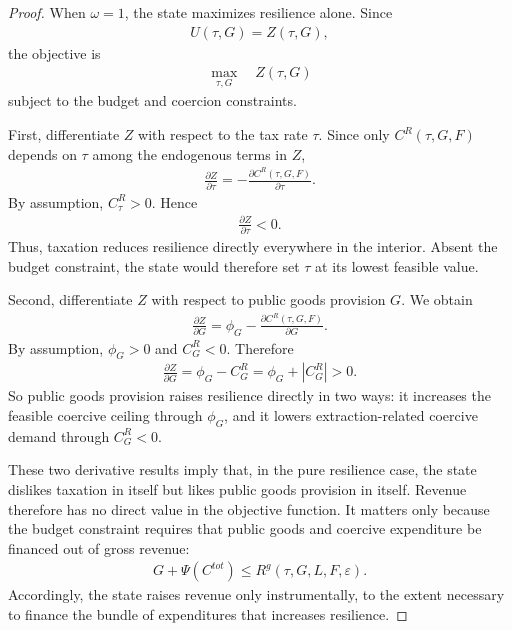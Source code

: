 \documentclass[12pt]{article}
\begin{document}
\begin{proof}
When $\omega=1$, the state maximizes resilience alone. Since
\begin{align}
U(\tau,G) = Z(\tau,G),
\end{align}
the objective is
\begin{align}
\max_{\tau,G} \quad Z(\tau,G)
\end{align}
subject to the budget and coercion constraints.

First, differentiate $Z$ with respect to the tax rate $\tau$. Since only $C^R(\tau,G,F)$ depends on $\tau$ among the endogenous terms in $Z$,
\begin{align}
\frac{\partial Z}{\partial \tau}
= - \frac{\partial C^R(\tau,G,F)}{\partial \tau}.
\end{align}
By assumption, $C^R_\tau>0$. Hence
\begin{align}
\frac{\partial Z}{\partial \tau} < 0.
\end{align}
Thus, taxation reduces resilience directly everywhere in the interior. Absent the budget constraint, the state would therefore set $\tau$ at its lowest feasible value.

Second, differentiate $Z$ with respect to public goods provision $G$. We obtain
\begin{align}
\frac{\partial Z}{\partial G}
= \phi_G - \frac{\partial C^R(\tau,G,F)}{\partial G}.
\end{align}
By assumption, $\phi_G>0$ and $C^R_G<0$. Therefore
\begin{align}
\frac{\partial Z}{\partial G}
= \phi_G - C^R_G
= \phi_G + |C^R_G|
> 0.
\end{align}
So public goods provision raises resilience directly in two ways: it increases the feasible coercive ceiling through $\phi_G$, and it lowers extraction-related coercive demand through $C^R_G<0$.

These two derivative results imply that, in the pure resilience case, the state dislikes taxation in itself but likes public goods provision in itself. Revenue therefore has no direct value in the objective function. It matters only because the budget constraint requires that public goods and coercive expenditure be financed out of gross revenue:
\begin{align}
G + \Psi(C^{tot}) \le R^g(\tau,G,L,F,\varepsilon).
\end{align}
Accordingly, the state raises revenue only instrumentally, to the extent necessary to finance the bundle of expenditures that increases resilience.


\end{proof}
\end{document}
